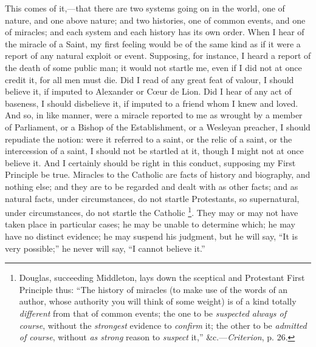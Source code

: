 This comes of it,—that there are two systems
going on in the world, one of nature, and one above
nature; and two histories, one of common events, and one
of miracles; and each system and each history has its own
order. When I hear of the miracle of a Saint, my first
feeling would be of the same kind as if it were a report
of any natural exploit or event. Supposing, for instance,
I heard a report of the death of some public man; it
would not startle me, even if I did not at once credit
it, for all men must die. Did I read of any great feat of
valour, I should believe it, if imputed to Alexander or Cœur de Lion. Did I hear of any act of baseness, I
should disbelieve it, if imputed to a friend whom I knew
and loved. And so, in like manner, were a miracle
reported to me as wrought by a member of Parliament, or a
Bishop of the Establishment, or a Wesleyan preacher, I
should repudiate the notion: were it referred to a saint,
or the relic of a saint, or the intercession of a saint,
I should not be startled at it, though I might not at
once believe it. And I certainly should be right in this
conduct, supposing my First Principle be true. Miracles
to the Catholic are facts of history and biography, and
nothing else; and they are to be regarded and dealt with
as other facts; and as natural facts, under
circumstances, do not startle Protestants, so
supernatural, under circumstances, do not startle the Catholic \footnote{Douglas, succeeding Middleton,
lays down the sceptical and Protestant First Principle
thus: ``The history of miracles (to make use of the
words of an author, whose authority you will think of
some weight) is of a kind totally \emph{different} from
that of common events; the one to be \emph{suspected always
of course}, without the \emph{strongest} evidence
to \emph{confirm} it; the other to be \emph{admitted of
course}, without \emph{as strong} reason to \emph{suspect}
it,'' \&c.—\emph{Criterion}, p. 26.}.
They may or may not have taken place in particular cases;
he may be unable to determine which; he may have no
distinct evidence; he may suspend his judgment, but he
will say, ``It is very possible;'' he never will
say, ``I cannot believe it.''

